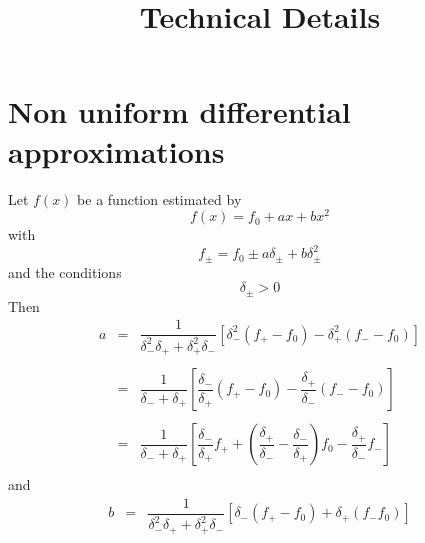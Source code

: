 \documentclass[11pt]{amsart}
\title{Technical Details}
\begin{document}
\maketitle


\section{Non uniform differential approximations}

Let $f(x)$ be a function estimated by
\[
	f(x) = f_0 + ax + b x^2
\]
with
\[
	f_\pm = f_0 \pm a \delta_\pm + b \delta_\pm^2
\]
and the conditions
\[
	\delta_\pm > 0 %
\]
Then
\[
\begin{array}{rcl}
	a & = &
	\dfrac{1}{\delta_-^2\delta_+ + \delta_+^2\delta_-}
	\left[ 
	   \delta_-^2\left(f_+ - f_0 \right)
	 - \delta_+^2\left(f_- - f_0 \right)
	\right] \\
	\\
	& = & \dfrac{1}{\delta_- + \delta_+} 
	\left[
	 \dfrac{\delta_-}{\delta_+} \left(f_+ - f_0 \right)
	-\dfrac{\delta_+}{\delta_-} \left(f_- - f_0 \right)
	\right] \\
	\\
	& = & \dfrac{1}{\delta_- + \delta_+} 
	\left[
	\dfrac{\delta_-}{\delta_+} f_+
	+\left(\dfrac{\delta_+}{\delta_-} - \dfrac{\delta_-}{\delta_+}\right) f_0
	-\dfrac{\delta_+}{\delta_-} f_-
	\right]\\
\end{array}
\]
and
\[
\begin{array}{rcl}
	b & = & \dfrac{1}{\delta_-^2\delta_+ + \delta_+^2\delta_-}
	\left[ 
	\delta_- \left(f_+ - f_0\right) + \delta_+ \left(f_-f_0\right)
	\right]
\\
\end{array}
\]
\end{document}
